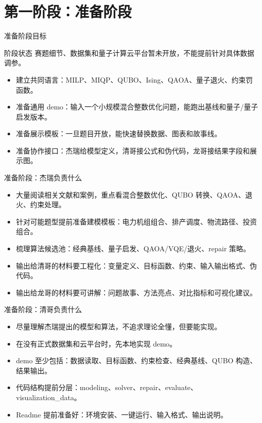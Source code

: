\documentclass[aspectratio=169]{beamer}
\begin{document}
\section{第一阶段：准备阶段}

\begin{frame}{准备阶段目标}
\small
\begin{block}{阶段状态}
  赛题细节、数据集和量子计算云平台暂未开放，不能提前针对具体数据调参。
\end{block}

\begin{itemize}
  \item 建立共同语言：MILP、MIQP、QUBO、Ising、QAOA、量子退火、约束罚函数。
  \item 准备通用 demo：输入一个小规模混合整数优化问题，能跑出基线和量子/量子启发版本。
  \item 准备展示模板：一旦题目开放，能快速替换数据、图表和故事线。
  \item 准备协作接口：杰瑞给模型定义，清哥接公式和伪代码，龙哥接结果字段和展示图。
\end{itemize}
\end{frame}

\begin{frame}{准备阶段：杰瑞负责什么}
\small
\begin{itemize}
  \item 大量阅读相关文献和案例，重点看混合整数优化、QUBO 转换、QAOA、退火、约束处理。
  \item 针对可能题型提前准备建模模板：电力机组组合、排产调度、物流路径、投资组合。
  \item 梳理算法候选池：经典基线、量子启发、QAOA/VQE/退火、repair 策略。
  \item 输出给清哥的材料要工程化：变量定义、目标函数、约束、输入输出格式、伪代码。
  \item 输出给龙哥的材料要可讲解：问题故事、方法亮点、对比指标和可视化建议。
\end{itemize}
\end{frame}

\begin{frame}{准备阶段：清哥负责什么}
\small
\begin{itemize}
  \item 尽量理解杰瑞提出的模型和算法，不追求理论全懂，但要能实现。
  \item 在没有正式数据集和云平台时，先本地实现 demo。
  \item demo 至少包括：数据读取、目标函数、约束检查、经典基线、QUBO 构造、结果输出。
  \item 代码结构提前分层：modeling、solver、repair、evaluate、visualization\_data。
  \item Readme 提前准备好：环境安装、一键运行、输入格式、输出说明。
\end{itemize}
\end{frame}
\end{document}
